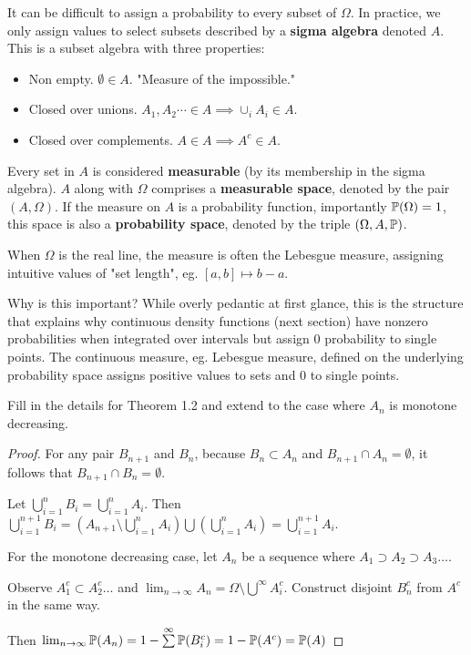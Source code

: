 \documentclass[10pt]{article}
\begin{document}
\begin{note}
    It can be difficult to assign a probability to every subset of $\Omega$. In
    practice, we only assign values to select subsets described by a \textbf{sigma
    algebra} denoted $A$. This is a subset algebra with three properties:

    \begin{itemize}
        \item{Non empty. $\emptyset \in A$. "Measure of the impossible."}
        \item{Closed over unions. $A_1, A_2 \cdots \in A \implies \cup_i A_i \in A$.}
        \item{Closed over complements. $A \in A \implies A^c \in A$.}
    \end{itemize}
    Every set in $A$ is considered \textbf{measurable} (by its membership in
    the sigma algebra). $A$ along with $\Omega$ comprises a \textbf{measurable
    space}, denoted by the pair $(A, \Omega)$. If the measure on $A$ is a
    probability function, importantly $\P(\Omega) = 1$, this space is also a
    \textbf{probability space}, denoted by the triple $(\Omega, A, \P)$.

    When $\Omega$ is the real line, the measure is often the Lebesgue measure,
    assigning intuitive values of "set length", eg. $[a, b] \mapsto b - a$.

    Why is this important? While overly pedantic at first glance, this is the
    structure that explains why continuous density functions (next section)
    have nonzero probabilities when integrated over intervals but assign 0
    probability to single points. The continuous measure, eg. Lebesgue measure,
    defined on the underlying probability space assigns positive values to sets
    and 0 to single points.
\end{note}


\begin{exercise}
    Fill in the details for Theorem 1.2 and extend to the case where $A_n$ is monotone decreasing.
\end{exercise}

\begin{proof}
    For any pair $B_{n+1}$ and $B_n$, because $B_n \subset A_n$ and $B_{n+1}
    \cap A_n = \emptyset$, it follows that $B_{n+1} \cap B_n = \emptyset$.

    Let $\bigcup_{i=1}^n B_i = \bigcup_{i=1}^n A_i$. Then $\bigcup_{i=1}^{n+1}
    B_i = (A_{n+1} \setminus \bigcup_{i=1}^n A_i) \bigcup (\bigcup_{i=1}^n
    A_i) = \bigcup_{i=1}^{n+1} A_i$.

    For the monotone decreasing case, let $A_n$ be a sequence where $A_1 \supset A_2 \supset A_3 \dots$. 

    Observe $A_1^c \subset A_2^c \dots$ and $\lim_{n \to \infty} A_n = \Omega
    \setminus \bigcup^{\infty} A_i^c$. Construct disjoint $B^c_n$ from $A^c$ in
    the same way.

    Then $\lim_{n \to \infty} \P(A_n) = 1 - \sum\limits^{\infty} \P(B^c_i) = 1 -
    \P(A^c) = \P(A)$
\end{proof}
\end{document}
